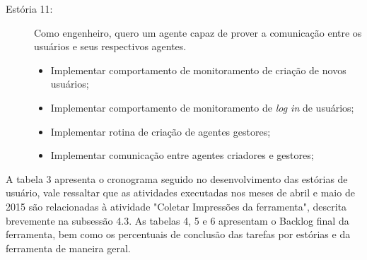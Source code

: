 \begin{description}
\item[Estória 11:]
Como engenheiro, quero um agente capaz de prover a comunicação entre os usuários e seus respectivos agentes.

\begin{itemize}

\item Implementar comportamento de monitoramento de criação de novos usuários;
\item Implementar comportamento de monitoramento de \textit{log in} de usuários;
\item Implementar rotina de criação de agentes gestores;
\item Implementar comunicação entre agentes criadores e gestores;

\end{itemize}

\end{description}

A tabela 3 apresenta o cronograma seguido no desenvolvimento das estórias de usuário, vale ressaltar que as atividades executadas nos meses de abril e maio de 2015 são relacionadas à atividade "Coletar Impressões da ferramenta", descrita brevemente na subsessão 4.3. As tabelas 4, 5 e 6 apresentam  o Backlog final da ferramenta, bem como os percentuais de conclusão das tarefas por estórias e da ferramenta de maneira geral.

